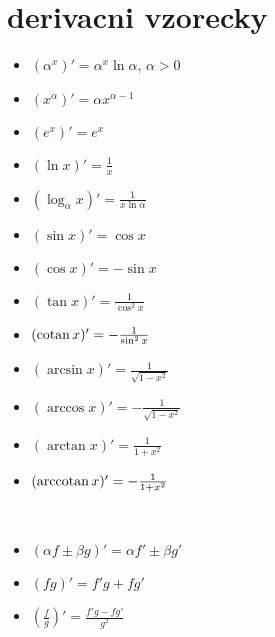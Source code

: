 \documentclass[a4paper]{article}
\def\cotan{\qopname\relax o{cotan}}
\def\arccotan{\qopname\relax o{arccotan}}
\begin{document}
\section*{derivacni vzorecky}
\begin{itemize}
	\item $(\alpha^x)' = \alpha^x\ln \alpha$, $\alpha>0$
	\item $(x^\alpha)' = \alpha x^{\alpha-1}$
	\item $(e^x)' = e^x$
	\item $(\ln x)' = \frac{1}{x}$
	\item $(\log_\alpha x)' = \frac{1}{x\ln \alpha}$
	\item $(\sin x)' = \cos x$
	\item $(\cos x)' = -\sin x$
	\item $(\tan x)' = \frac{1}{\cos^2 x}$
	\item $(\cotan x)' = -\frac{1}{\sin^2 x}$
	\item $(\arcsin x)' = \frac{1}{\sqrt{1-x^2}}$
	\item $(\arccos x)' = -\frac{1}{\sqrt{1-x^2}}$
	\item $(\arctan x)' = \frac{1}{1+x^2}$
	\item $(\arccotan x)' = -\frac{1}{1+x^2}$
\end{itemize}
~
\begin{itemize}
	\item $(\alpha f \pm \beta g)' = \alpha f' \pm \beta g'$
	\item $(fg)' = f'g + fg'$
	\item $(\frac{f}{g})' = \frac{f'g-fg'}{g^2}$
\end{itemize}
\end{document}
